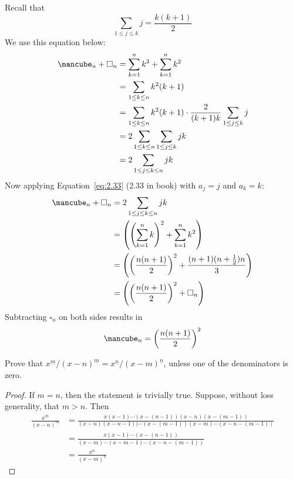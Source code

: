 \documentclass[12pt]{article}
\newenvironment{ex}[2][Exercise]{\begin{trivlist}
		\item[\hskip \labelsep {\bfseries #1}\hskip \labelsep {\bfseries #2.}]}{\end{trivlist}}
\newenvironment{sol}[1][Solution]{\begin{trivlist}
		\item[\hskip \labelsep {\bfseries #1:}]}{\end{trivlist}}
\begin{document}
\begin{sol}
	Recall that
	\[
	\sum_{1\leq j\leq k}j=\frac{k(k+1)}{2}
	\]
	We use this equation below:
	\begin{align*}
		\text{\mancube}_n+\square_n
		&=\sum_{k=1}^{n}k^3+\sum_{k=1}^{n}k^2\\
		&=\sum_{1\leq k\leq n}k^2(k+1)\\
		&=\sum_{1\leq k\leq n}k^2(k+1)
		\cdot
		\frac{2}{(k+1)k} \sum_{1\leq j\leq k}j\\
		&=2\sum_{1\leq k\leq n}\sum_{1\leq j\leq k}jk\\
		&=2\sum_{1\leq j\leq k\leq n}jk\\
	\end{align*}
	Now applying Equation~\ref{eq:2.33} (2.33 in book) with $a_j=j$ and $a_k=k$:
	\begin{align*}
		\text{\mancube}_n+\square_n&=
		2\sum_{1\leq j\leq k\leq n}jk\\
		&=\left(
		\left(\sum_{k=1}^{n}k\right)^2
		+\sum_{k=1}^{n}k^2
		\right)\\
		&=\left(
		\left(\frac{n(n+1)}{2}\right)^2
		+\frac{(n+1)(n+\frac{1}{2})n}{3}
		\right)\\
		&=\left(
		\left(\frac{n(n+1)}{2}\right)^2
		+\square_n
		\right)
	\end{align*}
	Subtracting $\square_n$ on both sides results in
	\begin{align*}
		\text{\mancube}_n=\left(\frac{n(n+1)}{2}\right)^2
	\end{align*}
\end{sol}

\begin{ex}{16}
	Prove that $x^{\underline{m}}/(x-n)^{\underline{m}}=x^{\underline{n}}/(x-m)^{\underline{n}}$,
	unless one of the denominators is zero.
\end{ex}

\begin{sol}
	\begin{proof}
		If $m=n$, then the statement is trivially true. Suppose, without loss generality,
		that $m>n$. Then
		\begin{align*}
			\frac{x^{\underline{m}}}{(x-n)^{\underline{m}}}
			&=\frac{x(x-1)\cdots(x-(n-1))(x-n)(x-(m-1))}
			{(x-n)(x-n-1))\cdots (x-(m-1))(x-m)\cdots  (x-n-(m-1))}\\
			&=\frac{x(x-1)\cdots(x-(n-1))}{(x-m)\cdots (x-m-1)\cdots (x-n-(m-1))}\\
			&=\frac{x^{\underline{n}}}{(x-m)^{\underline{n}}}
		\end{align*}
	\end{proof}
\end{sol}
\end{document}
